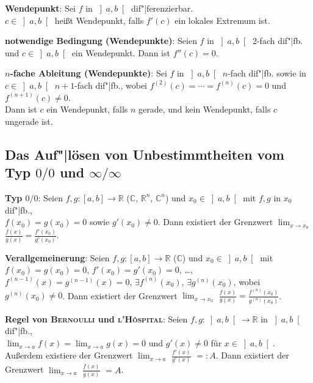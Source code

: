 \linie

\textbf{Wendepunkt}:
Sei $f$ in $\left]a,b\right[$ dif"|ferenzierbar. \\
$c \in \left]a,b\right[$ heißt Wendepunkt, falls $f'(c)$ ein lokales Extremum
ist.

\textbf{notwendige Bedingung (Wendepunkte)}:
Seien $f$ in $\left]a,b\right[$ 2-fach dif"|fb. und $c \in \left]a,b\right[$
ein Wendepunkt. \qquad
Dann ist $f''(c) = 0$.

\textbf{$n$-fache Ableitung (Wendepunkte)}:
Sei $f$ in $\left]a,b\right[$ $n$-fach dif"|fb. sowie in
$c \in \left]a,b\right[$ $n+1$-fach dif"|fb., wobei
$f^{(2)}(c) = \cdots = f^{(n)}(c) = 0$ und $f^{(n+1)}(c) \not= 0$. \\
Dann ist $c$ ein Wendepunkt, falls $n$ gerade, und kein Wendepunkt, falls
$c$ ungerade ist.

\pagebreak

\subsection{%
    \texorpdfstring
    {Das Auf"|lösen von Unbestimmtheiten vom Typ $0/0$ und $\infty/\infty$}%
    {Das Auf"|lösen von Unbestimmtheiten vom Typ 0/0 und ∞/∞}%
}

\textbf{Typ $0/0$}:
Seien $f, g: [a,b] \rightarrow \mathbb{R}$ ($\mathbb{C}$, $\mathbb{R}^n$,
$\mathbb{C}^n$) und $x_0 \in \left]a,b\right[$ mit $f, g$ in $x_0$ dif"|fb., \\
$f(x_0) = g(x_0) = 0$
sowie $g'(x_0) \not= 0$. \qquad
Dann existiert der Grenzwert $\lim_{x \to x_0}$
{\large $\frac{f(x)}{g(x)} = \frac{f'(x_0)}{g'(x_0)}$}.

\textbf{Verallgemeinerung}:
Seien $f, g: [a,b] \rightarrow \mathbb{R}$ ($\mathbb{C}$) und
$x_0 \in \left]a,b\right[$ mit $f(x_0) = g(x_0) = 0$,
$f'(x_0) = g'(x_0) = 0$, \dots, $f^{(n-1)}(x) = g^{(n-1)}(x) = 0$,
$\exists f^{(n)}(x_0)$, $\exists g^{(n)}(x_0)$, wobei $g^{(n)}(x_0) \not= 0$.
Dann existiert der Grenzwert $\lim_{x \to x_0}$
{\large $\frac{f(x)}{g(x)} = \frac{f^{(n)}(x_0)}{g^{(n)}(x_0)}$}.

\linie

\textbf{Regel von \textsc{Bernoulli} und \textsc{l'Hôspital}}:
Seien $f, g: \left]a,b\right[ \rightarrow \mathbb{R}$ in $\left]a,b\right[$
dif"|fb., \\
$\lim_{x \to a} f(x) = \lim_{x \to a} g(x) = 0$ und $g'(x) \not= 0$
für $x \in \left]a,b\right[$.
Außerdem existiere der Grenzwert $\lim_{x \to a}$%
{\large $\frac{f'(x)}{g'(x)}$} $=: A$. \qquad
Dann existiert der Grenzwert $\lim_{x \to a}$%
{\large $\frac{f(x)}{g(x)}$} $= A$.

